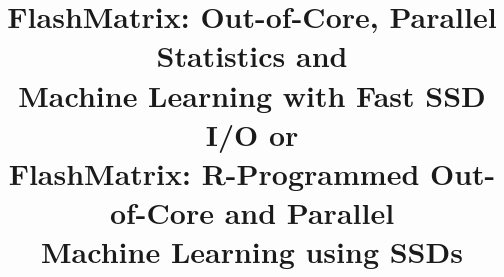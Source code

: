 \documentclass[letterpaper,twocolumn,10pt]{article}
\begin{document}
\date{}

\title{FlashMatrix: Out-of-Core, Parallel Statistics and \\ Machine Learning
             with Fast SSD I/O  or \\  %
FlashMatrix: R-Programmed Out-of-Core and Parallel \\Machine Learning using SSDs}
    
\author{}


\maketitle

\vspace{-25pt}

\thispagestyle{empty}
\end{document}
